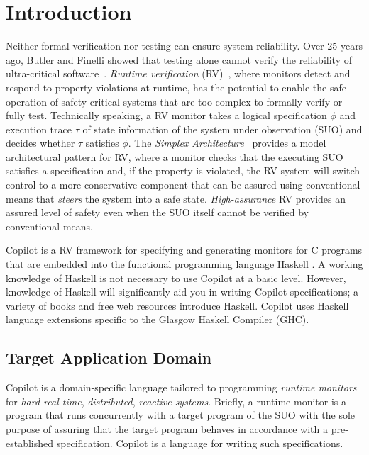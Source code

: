
\section{Introduction} \label{sec:introduction}


Neither formal verification nor testing can ensure system reliability.
%
Over 25 years ago, Butler and Finelli showed that testing alone cannot verify
the reliability of ultra-critical software~\cite{butler}.
%
\emph{Runtime verification} (RV)~\cite{monitors}, where monitors detect and
respond to property violations at runtime, has the potential to enable the safe
operation of safety-critical systems that are too complex to formally verify or
fully test.
%
Technically speaking, a RV monitor takes a logical specification $\phi$ and
execution trace $\tau$ of state information of the system under observation
(SUO) and decides whether $\tau$ satisfies $\phi$.
%
The \emph{Simplex Architecture}~\cite{simplex} provides a model architectural
pattern for RV, where a monitor checks that the executing SUO satisfies a
specification and, if the property is violated, the RV system will switch
control to a more conservative component that can be assured using conventional
means that \emph{steers} the system into a safe state.
%
\emph{High-assurance} RV provides an assured level of safety even when the SUO
itself cannot be verified by conventional means.

Copilot\cite{PerezGoodloe20} is a RV framework for specifying and generating monitors for C programs
that are embedded into the functional programming language Haskell
\cite{PeytonJones02}.
%
 A working knowledge of Haskell is not necessary to use Copilot at a basic
level.
%
 However, knowledge of Haskell will significantly aid you in writing Copilot
specifications;  a variety of books and free web resources introduce Haskell.
%
  Copilot uses Haskell language extensions specific to the Glasgow Haskell
Compiler (GHC).

\subsection{Target Application Domain} \label{domain}


Copilot is a domain-specific language tailored to programming \emph{runtime
monitors} for \emph{hard real-time}, \emph{distributed}, \emph{reactive
systems}.
%
Briefly, a runtime monitor is a program that runs concurrently with a target
program of the SUO with the sole purpose of assuring that the target program
behaves in accordance with a pre-established specification.
%
 Copilot is a language for writing such specifications.
%

